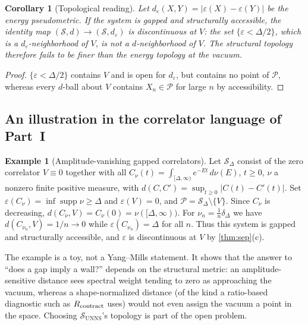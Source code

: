 \documentclass[11pt,a4paper]{article}
\newtheorem{corollary}{Corollary}
\theoremstyle{definition}
\newtheorem{example}{Example}
\theoremstyle{remark}
\newcommand{\SUNNS}{\mathcal{S}_{\mathrm{UNNS}}}
\newcommand{\Pset}{\mathcal{P}}
\begin{document}
\begin{corollary}[Topological reading]\label{cor:top}
Let $d_\varepsilon(X,Y)=|\varepsilon(X)-\varepsilon(Y)|$ be the energy pseudometric. If the system is gapped and structurally accessible, the identity map $(\mathcal S,d)\to(\mathcal S,d_\varepsilon)$ is discontinuous at $V$: the set $\{\varepsilon<\Delta/2\}$, which is a $d_\varepsilon$-neighborhood of $V$, is not a $d$-neighborhood of $V$. The structural topology therefore fails to be finer than the energy topology at the vacuum.
\end{corollary}
\begin{proof}
$\{\varepsilon<\Delta/2\}$ contains $V$ and is open for $d_\varepsilon$, but contains no point of $\Pset$, whereas every $d$-ball about $V$ contains $X_n\in\Pset$ for large $n$ by accessibility.
\end{proof}

\subsection{An illustration in the correlator language of Part~I}
\begin{example}[Amplitude-vanishing gapped correlators]\label{ex:corr}
Let $\mathcal S_\Delta$ consist of the zero correlator $V\equiv0$ together with all $C_\nu(t)=\int_{[\Delta,\infty)}e^{-Et}\,d\nu(E)$, $t\ge0$, $\nu$ a nonzero finite positive measure, with $d(C,C')=\sup_{t\ge0}|C(t)-C'(t)|$. Set $\varepsilon(C_\nu)=\inf\operatorname{supp}\nu\ge\Delta$ and $\varepsilon(V)=0$, and $\Pset=\mathcal S_\Delta\setminus\{V\}$. Since $C_\nu$ is decreasing, $d(C_\nu,V)=C_\nu(0)=\nu([\Delta,\infty))$. For $\nu_n=\tfrac1n\delta_\Delta$ we have $d(C_{\nu_n},V)=1/n\to0$ while $\varepsilon(C_{\nu_n})=\Delta$ for all $n$. Thus this system is gapped and structurally accessible, and $\varepsilon$ is discontinuous at $V$ by \cref{thm:sep}(c).
\end{example}
The example is a toy, not a Yang--Mills statement. It shows that the answer to ``does a gap imply a wall?'' depends on the structural metric: an amplitude-sensitive distance sees spectral weight tending to zero as approaching the vacuum, whereas a shape-normalized distance (of the kind a ratio-based diagnostic such as $R_{\rm contract}$ uses) would not even assign the vacuum a point in the space. Choosing $\SUNNS$'s topology is part of the open problem.
\end{document}
